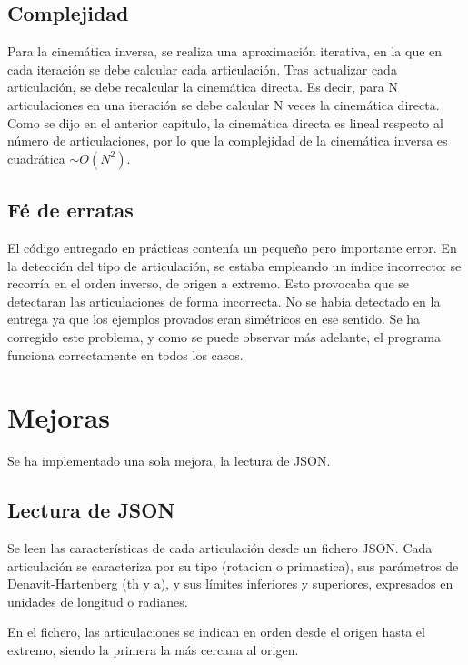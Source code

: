 \subsection{Complejidad}
Para la cinemática inversa, se realiza una aproximación iterativa, en la que en cada iteración se debe calcular cada articulación.
Tras actualizar cada articulación, se debe recalcular la cinemática directa.
Es decir, para N articulaciones en una iteración se debe calcular N veces la cinemática directa. Como se dijo en el anterior capítulo, la cinemática directa es lineal respecto al número de articulaciones, por lo que la complejidad de la cinemática inversa es cuadrática $\sim O(N^2) $.

\subsection{Fé de erratas}
El código entregado en prácticas contenía un pequeño pero importante error. En la detección del tipo de articulación, se estaba empleando un índice incorrecto: se recorría en el orden inverso, de origen a extremo. Esto provocaba que se detectaran las articulaciones de forma incorrecta. No se había detectado en la entrega ya que los ejemplos provados eran simétricos en ese sentido. Se ha corregido este problema, y como se puede observar más adelante, el programa funciona correctamente en todos los casos.


\section{Mejoras}
Se ha implementado una sola mejora, la lectura de JSON.

\subsection{Lectura de JSON}
Se leen las características de cada articulación desde un fichero JSON. Cada articulación se caracteriza por su tipo (rotacion o primastica), sus parámetros de Denavit-Hartenberg (th y a),
y sus límites inferiores y superiores, expresados en unidades de longitud o radianes.

En el fichero, las articulaciones se indican en orden desde el origen hasta el extremo, siendo la primera la más cercana al origen.

